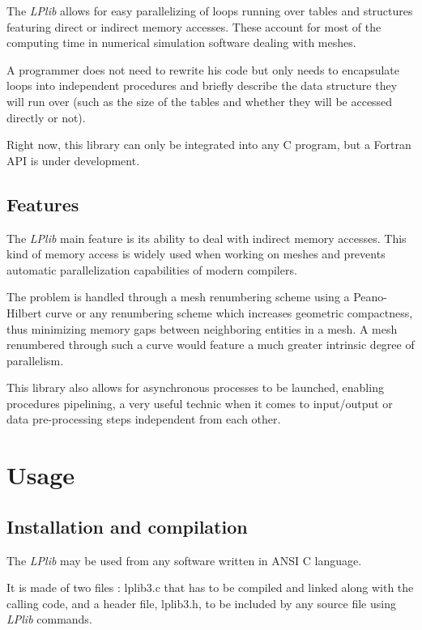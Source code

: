 \documentclass[a4paper,12pt]{article}
\begin{document}
The \emph{LPlib} allows for easy parallelizing of loops running over tables and structures featuring direct or indirect memory accesses. These account for most of the computing time in numerical simulation software dealing with meshes.

A programmer does not need to rewrite his code but only needs to encapsulate loops into independent procedures and briefly describe the data structure they will run over (such as the size of the tables and whether they will be accessed directly or not).

Right now, this library can only be integrated into any C program, but a Fortran API is under development.

\subsection{Features}

The \emph{LPlib} main feature is its ability to deal with indirect memory accesses. This kind of memory access is widely used when working on meshes and prevents automatic parallelization capabilities of modern compilers.

The problem is handled through a mesh renumbering scheme using a Peano-Hilbert curve \cite{peano_hilbert} or any renumbering scheme which increases geometric compactness, thus minimizing memory gaps between neighboring entities in a mesh. A mesh renumbered through such a curve would feature a much greater intrinsic degree of parallelism.

This library also allows for asynchronous processes to be launched, enabling procedures pipelining, a very useful technic when it comes to input/output or data pre-processing steps independent from each other.


%
%

\section{Usage}

\subsection{Installation and compilation}

The \emph{LPlib} may be used from any software written in ANSI C language.

It is made of two files : lplib3.c that has to be compiled and linked along with the calling code, and a header file, lplib3.h, to be included by any source file using \emph{LPlib} commands.
\end{document}
